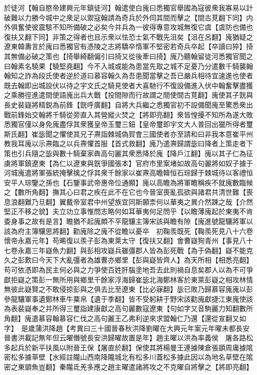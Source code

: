 於徒河【翰自愍帝建興元年鎮徒河】翰遣使白廆曰悉獨官舉國為寇彼衆我寡易以計破難以力勝今城中之衆足以禦寇翰請為奇兵於外伺其間而擊之【間古莧翻下同】内外俱奮使彼震駭不知所備破之必矣今并兵為一彼得專意攻城無復它虞【虞防也備也復扶又翻下同】非策之得者也且示衆以怯恐士氣不戰先沮矣【沮在呂翻】廆猶疑之遼東韓夀言於廆曰悉獨官有憑陵之志將驕卒惰軍不堅密若奇兵卒起【卒讀曰猝】掎其無備必破之策也【掎舉綺翻偏引曰掎又從後牽曰掎】廆乃聽翰留徒河悉獨官聞之曰翰素名驍果【驍堅堯翻】今不入城或能為患當先取之城不足憂乃分遣數千騎襲翰翰知之詐為段氏使者逆於道曰慕容翰久為吾患聞當擊之吾已嚴兵相待宜速進也使者既去翰即出城設伏以待之宇文氏之騎見使者大喜馳行不復設備進入伏中翰奮擊盡獲之乘勝徑進遣間使語廆出兵大戰【投間隙而行故謂之間使間古莧翻】廆使其子皝與長史裴嶷將精鋭為前鋒【皝呼廣翻】自將大兵繼之悉獨官初不設備聞廆至驚悉衆出戰前鋒始交翰將千騎從旁直入其營縱火焚之【將即亮翻】衆皆惶擾不知所為遂大敗悉獨官僅以身免廆盡俘其衆獲皇帝玉璽三鈕【皇帝璽即宇文大人普回出獵所得者璽斯氏翻】崔毖聞之懼使其兄子燾詣棘城偽賀會三國使者亦至請和曰非我本意崔平州教我耳廆以示燾臨之以兵燾懼首服【首式救翻】廆乃遣燾歸謂毖曰降者上策走者下策也引兵隨之毖與數十騎棄家犇高句麗其衆悉降於廆【降戶江翻】廆以其子仁為征虜將軍鎮遼東【為仁以遼東與皝爭國張本】官府市里案堵如故高句麗將如奴子據于河城廆遣將軍張統掩擊擒之俘其衆千餘家以崔燾高瞻韓恒石琮歸于棘城待以客禮恒安平人琮鑒之孫也【石鑒事武帝惠帝位通顯】廆以高瞻為將軍瞻稱疾不就廆數臨候之【數所角翻】撫其心曰君之疾在此不在它也今晉室喪亂孤欲與諸君共清世難【喪息浪翻難乃旦翻】翼戴帝室君中州望族宜同斯願柰何以華夷之異介然踈之哉【介然堅正不移之貌】夫立功立事惟問志略何如耳華夷何足問乎【以瞻薄廆起於東夷不肯委身事之故有是言】瞻猶不起廆頗不平龍驤主簿宋該與瞻有隙【廆進號龍驤將軍以該為府主簿驤思將翻】勸廆除之廆不從瞻以憂卒　初鞠羨既死【鞠羨死見八十六卷懷帝永嘉元年】苟晞復以羨子彭為東萊太守【復扶又翻】會曹嶷狥青州【事見八十七卷永嘉三年嶷魚力翻】與彭相攻嶷兵雖彊郡人皆為彭死戰【為于偽翻】嶷不能克久之彭歎曰今天下大亂彊者為雄曹亦鄉里【彭與嶷皆齊人】為天所相【相悉亮翻】苟可依憑即為民主何必與之力爭使百姓肝腦塗地吾去此則禍自息矣郡人以為不可爭獻拒嶷之策彭一無所用與鄉里千餘家浮海歸崔毖北海鄭林客於東萊彭嶷之相攻林情無彼此嶷賢之不敢侵掠彭與之俱去比至遼東【比必寐翻】毖已敗乃歸慕容廆廆以彭參龍驤軍事遺鄭林車牛粟帛【遺于季翻】皆不受躬耕于野宋該勸廆獻捷江東廆使該為表裴嶷奉之并所得三璽詣建康獻之高句麗數寇遼東【句如字又音駒麗力知翻數所角翻】廆遣慕容翰慕容仁伐之高句麗王乙弗利逆來求盟翰仁乃還【還從宣翻又如字】　是歲蒲洪降趙【考異曰三十國晉春秋洪降劉曜在大興元年案元年曜未都長安晉書洪載記無年但云曜僭號長安洪歸曜故置是年】趙主曜以洪為率義侯　屠各路松多起兵於新平扶風以附晉王保【屠直於翻】保使其將楊曼王連據陳倉張顗周庸據隂密松多據草壁【水經註隴山西南降隴城北有松多川蓋松多據此因以為地名草壁在隂密之東顗魚豈翻】秦隴氐羌多應之趙主曜遣諸將攻之不克曜自將擊之【將即亮翻】

